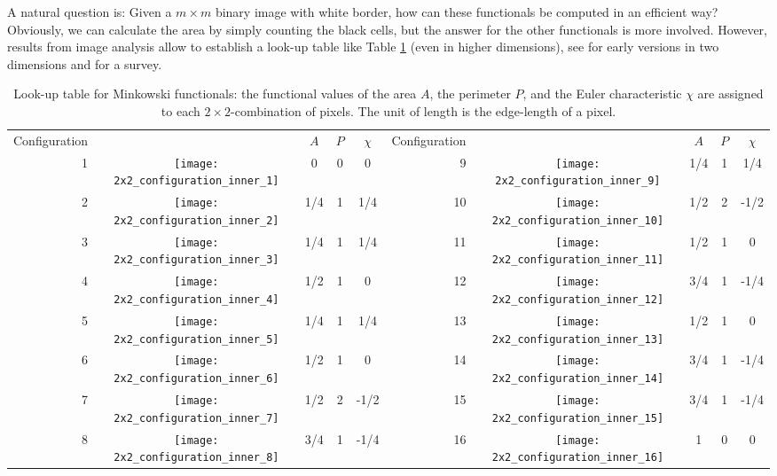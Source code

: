 \documentclass[12pt]{article}
\begin{document}
A natural question is: Given a $m\times m$ binary image with white border, how can these functionals be computed in an efficient way?
Obviously, we can calculate the area by simply counting the black cells, but the answer for the other functionals is more involved.
However, results from image analysis allow to establish a look-up table like Table \ref{tab:MinkowskiFunctionalsLookUpTable} (even in higher dimensions), see \cite{37,46,47} for early versions in two dimensions and \cite{10} for a survey.
\begin{table}[t]
  \caption{Look-up table for Minkowski functionals: the functional values of the area $A$, the perimeter $P$, and the Euler characteristic $\chi$ are assigned to each $2\times 2$-combination of pixels. The unit of length is the edge-length of a pixel.}
      \label{tab:MinkowskiFunctionalsLookUpTable}
      \vspace*{2mm}
  \centering
  \begin{tabular}{r c     c c c     r c     c c c}
   \toprule
   Configuration &  & $A$ & $P$ & $\chi$ &  Configuration &  & $A$ & $P$ & $\chi$ \\
   \cmidrule(rl){1-5}\cmidrule(rl){6-10}
    1  & \texttt{[image: 2x2\_configuration\_inner\_1]}  & 0   & 0 & 0    & 9  & \texttt{[image: 2x2\_configuration\_inner\_9]}   & 1/4 & 1 & 1/4    \\
    2  & \texttt{[image: 2x2\_configuration\_inner\_2]}  & 1/4 & 1 & 1/4  & 10 & \texttt{[image: 2x2\_configuration\_inner\_10]}  & 1/2 & 2 & -1/2   \\
    3  & \texttt{[image: 2x2\_configuration\_inner\_3]}  & 1/4 & 1 & 1/4  & 11 & \texttt{[image: 2x2\_configuration\_inner\_11]}  & 1/2 & 1 & 0     \\
    4  & \texttt{[image: 2x2\_configuration\_inner\_4]}  & 1/2 & 1 & 0    & 12 & \texttt{[image: 2x2\_configuration\_inner\_12]}  & 3/4 & 1 & -1/4   \\
    5  & \texttt{[image: 2x2\_configuration\_inner\_5]}  & 1/4 & 1 & 1/4  & 13 & \texttt{[image: 2x2\_configuration\_inner\_13]}  & 1/2 & 1 & 0      \\
    6  & \texttt{[image: 2x2\_configuration\_inner\_6]}  & 1/2 & 1 & 0    & 14 & \texttt{[image: 2x2\_configuration\_inner\_14]}  & 3/4 & 1 & -1/4   \\
    7  & \texttt{[image: 2x2\_configuration\_inner\_7]}  & 1/2 & 2 & -1/2 & 15 & \texttt{[image: 2x2\_configuration\_inner\_15]}  & 3/4 & 1 & -1/4   \\
    8  & \texttt{[image: 2x2\_configuration\_inner\_8]}  & 3/4 & 1 & -1/4 & 16 & \texttt{[image: 2x2\_configuration\_inner\_16]}  & 1   & 0 & 0        \\
  \end{tabular}
\end{table}
\end{document}
